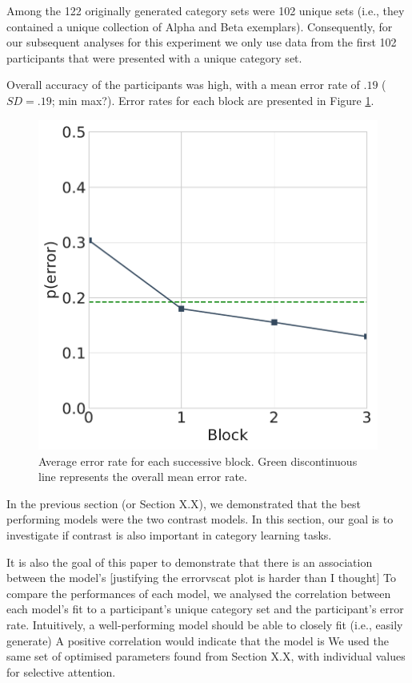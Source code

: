 Among the 122 originally generated category sets were 102 unique sets (i.e.,
they contained a unique collection of Alpha and Beta exemplars). Consequently,
for our subsequent analyses for this experiment we only use data from the first
102 participants that were presented with a unique category set.

Overall accuracy of the participants was high, with a mean error rate of $.19$
($SD = .19$; min max?). Error rates for each block are presented in Figure
\ref{fig:learningcurve}.

\begin{figure}
    \begin{center}
    \includegraphics[width=\textwidth/2]{figs/e3-learningcurve.pdf}
    \caption{Average error rate for each successive block. Green discontinuous
      line represents the overall mean error rate.}
    \label{fig:learningcurve}
    \end{center}
\end{figure}

In the previous section (or Section X.X), we demonstrated that the best
performing models were the two contrast models. In this section, our goal is to
investigate if contrast is also important in category learning tasks.

It is also the
goal of this paper to demonstrate that there is an association between the
model's [justifying the errorvscat plot is harder than I thought] To compare the
performances of each model, we analysed the correlation between each model's fit
to a participant's unique category set and the participant's error rate.
Intuitively, a well-performing model should be able to closely fit (i.e., easily
generate) A positive correlation would indicate that the model is We used the
same set of optimised parameters found from Section X.X, with individual values
for selective attention.

